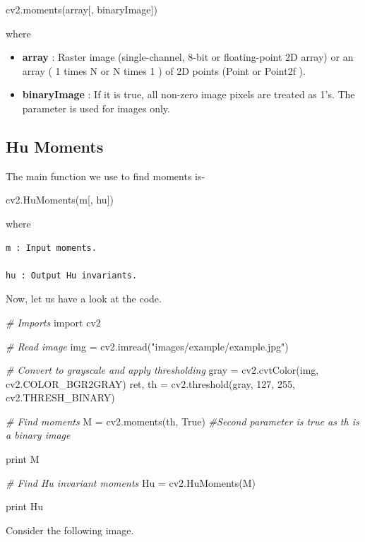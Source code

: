 \documentclass[]{article}
\newenvironment{Shaded}{}{}
\newcommand{\DecValTok}[1]{\textcolor[rgb]{0.25,0.63,0.44}{{#1}}}
\newcommand{\StringTok}[1]{\textcolor[rgb]{0.25,0.44,0.63}{{#1}}}
\newcommand{\ImportTok}[1]{{#1}}
\newcommand{\CommentTok}[1]{\textcolor[rgb]{0.38,0.63,0.69}{\textit{{#1}}}}
\newcommand{\VariableTok}[1]{\textcolor[rgb]{0.10,0.09,0.49}{{#1}}}
\newcommand{\OperatorTok}[1]{\textcolor[rgb]{0.40,0.40,0.40}{{#1}}}
\newcommand{\BuiltInTok}[1]{{#1}}
\newcommand{\NormalTok}[1]{{#1}}
\begin{document}
\begin{Shaded}
\begin{Highlighting}[]
    \NormalTok{cv2.moments(array[, binaryImage])}
\end{Highlighting}
\end{Shaded}

where

\begin{itemize}
	\item \textbf{array} : Raster image (single-channel, 8-bit or floating-point 2D array) or an array ( 1 times N or  N times 1 ) of 2D points (Point or Point2f ).

	\item \textbf{binaryImage} : If it is true, all non-zero image pixels are treated as 1’s. The parameter is used for images only.
\end{itemize}

\subsection{Hu Moments}\label{hu-moments}

The main function we use to find moments is-

\begin{Shaded}
\begin{Highlighting}[]
    \NormalTok{cv2.HuMoments(m[, hu])}
\end{Highlighting}
\end{Shaded}

where

\begin{verbatim}
m : Input moments.

hu : Output Hu invariants.
\end{verbatim}

Now, let us have a look at the code.

\begin{Shaded}
\begin{Highlighting}[]
\CommentTok{# Imports}
\ImportTok{import} \NormalTok{cv2}

\CommentTok{# Read image}
\NormalTok{img }\OperatorTok{=} \NormalTok{cv2.imread(}\StringTok{"images/example/example.jpg"}\NormalTok{)}

\CommentTok{# Convert to grayscale and apply thresholding}
\NormalTok{gray }\OperatorTok{=} \NormalTok{cv2.cvtColor(img, cv2.COLOR_BGR2GRAY)}
\NormalTok{ret, th }\OperatorTok{=} \NormalTok{cv2.threshold(gray, }\DecValTok{127}\NormalTok{, }\DecValTok{255}\NormalTok{, cv2.THRESH_BINARY)}

\CommentTok{# Find moments}
\NormalTok{M }\OperatorTok{=} \NormalTok{cv2.moments(th, }\VariableTok{True}\NormalTok{) }\CommentTok{#Second parameter is true as th is a binary image}

\BuiltInTok{print} \NormalTok{M}

\CommentTok{# Find Hu invariant moments}
\NormalTok{Hu }\OperatorTok{=} \NormalTok{cv2.HuMoments(M)}

\BuiltInTok{print} \NormalTok{Hu}
\end{Highlighting}
\end{Shaded}
\pagebreak
Consider the following image.
\end{document}
